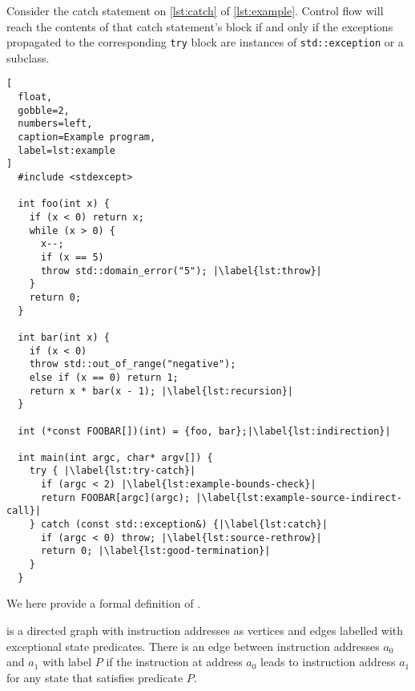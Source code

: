 \begin{example}
  Consider the catch statement on \cref{lst:catch} of \cref{lst:example}.
  Control flow will reach the contents of that catch statement's block if and only if the exceptions propagated to the corresponding \lstinline|try| block are instances of \lstinline|std::exception| or a subclass.
\end{example}
\begin{lstlisting}[
  float,
  gobble=2,
  numbers=left,
  caption=Example program,
  label=lst:example
]
  #include <stdexcept>

  int foo(int x) {
    if (x < 0) return x;
    while (x > 0) {
      x--;
      if (x == 5)
      throw std::domain_error("5"); |\label{lst:throw}|
    }
    return 0;
  }

  int bar(int x) {
    if (x < 0)
    throw std::out_of_range("negative");
    else if (x == 0) return 1;
    return x * bar(x - 1); |\label{lst:recursion}|
  }

  int (*const FOOBAR[])(int) = {foo, bar};|\label{lst:indirection}|

  int main(int argc, char* argv[]) {
    try { |\label{lst:try-catch}|
      if (argc < 2) |\label{lst:example-bounds-check}|
      return FOOBAR[argc](argc); |\label{lst:example-source-indirect-call}|
    } catch (const std::exception&) {|\label{lst:catch}|
      if (argc < 0) throw; |\label{lst:source-rethrow}|
      return 0; |\label{lst:good-termination}|
    }
  }
\end{lstlisting}

We here provide a formal definition of .
\begin{definition}[EICFGs]\label{def:eicfg}
   is a directed graph with instruction addresses as vertices and edges labelled with exceptional state predicates.
  There is an edge between instruction addresses $a_0$ and $a_1$ with label $P$ if the instruction at address $a_0$ leads to instruction address $a_1$ for any state that satisfies predicate $P$.
\end{definition}

